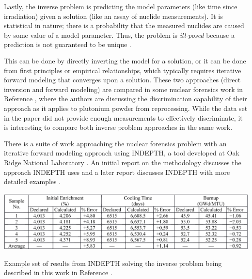 Lastly, the inverse problem is predicting the model parameters (like time since
irradiation) given a solution (like an assay of nuclide measurements).  It is
statistical in nature; there is a probability that the measured nuclides are
caused by some value of a model parameter. Thus, the problem is
\textit{ill-posed} because a prediction is not guaranteed to be unique
\cite{skutnik_2016}. 

This can be done by directly inverting the model for a solution, or it can be
done from first principles or empirical relationships, which typically requires
iterative forward modeling that converges upon a solution. These two approaches
(direct inversion and forward modeling) are compared in some nuclear forensics
work in Reference \cite{inverse_compare}, where the authors are discussing the
discrimination capability of their approach as it applies to plutonium powder
from reprocessing. While the data set in the paper did not provide enough
measurements to effectively discriminate, it is interesting to compare both
inverse problem approaches in the same work.   

There is a suite of work approaching the nuclear forensics problem with an
iterative forward modeling approach using \gls{INDEPTH}, a tool developed at
Oak Ridge National Laboratory \cite{grogan_sensitivity1, grogan_sensitivity2,
grogan_indepth_2018, weber_2006, weber_2010, weber_2011}.  An initial report on
the methodology discusses the approach \gls{INDEPTH} uses \cite{weber_2006} and
a later report discusses \gls{INDEPTH} with more detailed examples
\cite{grogan_indepth_2018}.  

\begin{table}[!htb]
  \centering
  \includegraphics[width=\linewidth]{./chapters/litrev/indepth.png}
  \caption[Example of results from \acrshort{INDEPTH}]
          {Example set of results from \acrshort{INDEPTH} solving the inverse 
           problem being described in this work in Reference 
           \cite{grogan_indepth_2018}.}
  \label{tbl:indepth}
\end{table}


